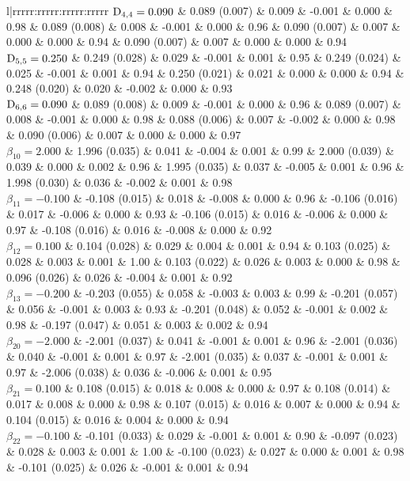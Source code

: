 \begin{landscape}
\begin{table}[ht]
\begin{tabular}{l|rrrrr:rrrrr:rrrrr:rrrrr}
  $\mathrm{D}_{4,4} = 0.090$ &  0.089 (0.007) & 0.009 & -0.001 & 0.000 & 0.98 &  0.089 (0.008) & 0.008 & -0.001 & 0.000 & 0.96 &  0.090 (0.007) & 0.007 &  0.000 & 0.000 & 0.94 &  0.090 (0.007) & 0.007 &  0.000 & 0.000 & 0.94 \\ 
  $\mathrm{D}_{5,5} = 0.250$ &  0.249 (0.028) & 0.029 & -0.001 & 0.001 & 0.95 &  0.249 (0.024) & 0.025 & -0.001 & 0.001 & 0.94 &  0.250 (0.021) & 0.021 &  0.000 & 0.000 & 0.94 &  0.248 (0.020) & 0.020 & -0.002 & 0.000 & 0.93 \\ 
  $\mathrm{D}_{6,6} = 0.090$ &  0.089 (0.008) & 0.009 & -0.001 & 0.000 & 0.96 &  0.089 (0.007) & 0.008 & -0.001 & 0.000 & 0.98 &  0.088 (0.006) & 0.007 & -0.002 & 0.000 & 0.98 &  0.090 (0.006) & 0.007 &  0.000 & 0.000 & 0.97 \\ 
  $\beta_{10} = 2.000$ &  1.996 (0.035) & 0.041 & -0.004 & 0.001 & 0.99 &  2.000 (0.039) & 0.039 &  0.000 & 0.002 & 0.96 &  1.995 (0.035) & 0.037 & -0.005 & 0.001 & 0.96 &  1.998 (0.030) & 0.036 & -0.002 & 0.001 & 0.98 \\ 
  $\beta_{11} = -0.100$ & -0.108 (0.015) & 0.018 & -0.008 & 0.000 & 0.96 & -0.106 (0.016) & 0.017 & -0.006 & 0.000 & 0.93 & -0.106 (0.015) & 0.016 & -0.006 & 0.000 & 0.97 & -0.108 (0.016) & 0.016 & -0.008 & 0.000 & 0.92 \\ 
  $\beta_{12} = 0.100$ &  0.104 (0.028) & 0.029 &  0.004 & 0.001 & 0.94 &  0.103 (0.025) & 0.028 &  0.003 & 0.001 & 1.00 &  0.103 (0.022) & 0.026 &  0.003 & 0.000 & 0.98 &  0.096 (0.026) & 0.026 & -0.004 & 0.001 & 0.92 \\ 
  $\beta_{13} = -0.200$ & -0.203 (0.055) & 0.058 & -0.003 & 0.003 & 0.99 & -0.201 (0.057) & 0.056 & -0.001 & 0.003 & 0.93 & -0.201 (0.048) & 0.052 & -0.001 & 0.002 & 0.98 & -0.197 (0.047) & 0.051 &  0.003 & 0.002 & 0.94 \\ 
  $\beta_{20} = -2.000$ & -2.001 (0.037) & 0.041 & -0.001 & 0.001 & 0.96 & -2.001 (0.036) & 0.040 & -0.001 & 0.001 & 0.97 & -2.001 (0.035) & 0.037 & -0.001 & 0.001 & 0.97 & -2.006 (0.038) & 0.036 & -0.006 & 0.001 & 0.95 \\ 
  $\beta_{21} = 0.100$ &  0.108 (0.015) & 0.018 &  0.008 & 0.000 & 0.97 &  0.108 (0.014) & 0.017 &  0.008 & 0.000 & 0.98 &  0.107 (0.015) & 0.016 &  0.007 & 0.000 & 0.94 &  0.104 (0.015) & 0.016 &  0.004 & 0.000 & 0.94 \\ 
  $\beta_{22} = -0.100$ & -0.101 (0.033) & 0.029 & -0.001 & 0.001 & 0.90 & -0.097 (0.023) & 0.028 &  0.003 & 0.001 & 1.00 & -0.100 (0.023) & 0.027 &  0.000 & 0.001 & 0.98 & -0.101 (0.025) & 0.026 & -0.001 & 0.001 & 0.94 \\ 

\end{tabular}
\end{table}
\end{landscape}
